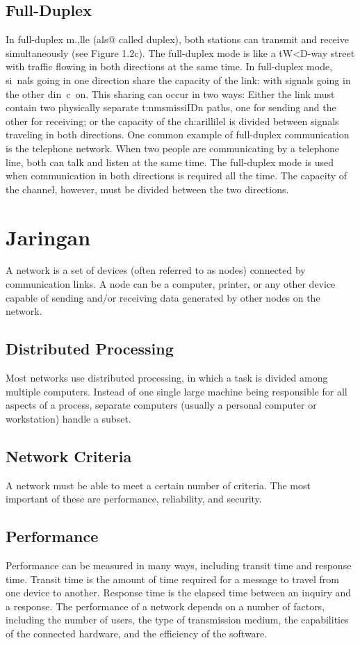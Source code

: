\subsection*{Full-Duplex}
In full-duplex m.,lle (als@ called duplex), both stations can transmit and receive simultaneously (see Figure 1.2c). The full-duplex mode is like a tW<D-way street with traffic flowing in both directions at the same time. In full-duplex mode, si~nals going in one direction share the capacity of the link: with signals going in the other din~c~on. This sharing can occur in two ways: Either the link must contain two physically separate t:nmsmissiIDn paths, one for sending and the other for receiving; or the capacity of the ch:arillilel is divided between signals traveling in both directions. One common example of full-duplex communication is the telephone network. When two people are communicating by a telephone line, both can talk and listen at the same time. The full-duplex mode is used when communication in both directions is required all the time. The capacity of the channel, however, must be divided between the two directions.

\section{Jaringan}
A network is a set of devices (often referred to as nodes) connected by communication links. A node can be a computer, printer, or any other device capable of sending and/or receiving data generated by other nodes on the network.

\subsection{Distributed Processing}
Most networks use distributed processing, in which a task is divided among multiple computers. Instead of one single large machine being responsible for all aspects of a process, separate computers (usually a personal computer or workstation) handle a subset.

\subsection{Network Criteria}
A network must be able to meet a certain number of criteria. The most important of these are performance, reliability, and security.

\subsection*{Performance}
Performance can be measured in many ways, including transit time and response time. Transit time is the amount of time required for a message to travel from one device to another. Response time is the elapsed time between an inquiry and a response. The performance of a network depends on a number of factors, including the number of users, the type of transmission medium, the capabilities of the connected hardware, and the efficiency of the software.

